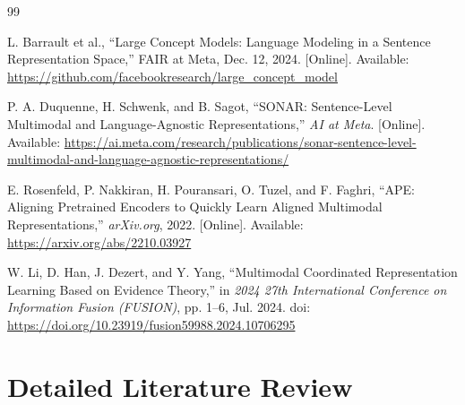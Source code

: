 \documentclass[12pt, a4paper]{article}
\begin{document}
\begin{thebibliography}{99}

L. Barrault et al., ``Large Concept Models: Language Modeling in a Sentence Representation Space,'' FAIR at Meta, Dec. 12, 2024. [Online]. Available: \url{https://github.com/facebookresearch/large_concept_model}

P. A. Duquenne, H. Schwenk, and B. Sagot, ``SONAR: Sentence-Level Multimodal and Language-Agnostic Representations,'' \textit{AI at Meta}. [Online]. Available: \url{https://ai.meta.com/research/publications/sonar-sentence-level-multimodal-and-language-agnostic-representations/}

E. Rosenfeld, P. Nakkiran, H. Pouransari, O. Tuzel, and F. Faghri, ``APE: Aligning Pretrained Encoders to Quickly Learn Aligned Multimodal Representations,'' \textit{arXiv.org}, 2022. [Online]. Available: \url{https://arxiv.org/abs/2210.03927}

W. Li, D. Han, J. Dezert, and Y. Yang, ``Multimodal Coordinated Representation Learning Based on Evidence Theory,'' in \textit{2024 27th International Conference on Information Fusion (FUSION)}, pp. 1--6, Jul. 2024. doi: \url{https://doi.org/10.23919/fusion59988.2024.10706295}

\end{thebibliography}

\appendix

\section{Detailed Literature Review}
\label{app:litreview}

\end{document}
